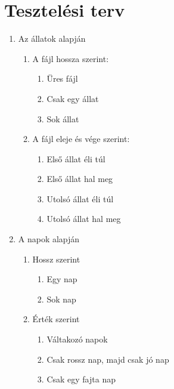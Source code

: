 \documentclass[a4paper]{article}
\begin{document}
	
	\newpage
	\section{Tesztelési terv}	
	\begin{enumerate}
		\item Az állatok alapján
		\begin{enumerate}
			\item A fájl hossza szerint:
			\begin{enumerate}
				\item Üres fájl
				\item Csak egy állat
				\item Sok állat
			\end{enumerate}
		
		\item A fájl eleje és vége szerint:
		\begin{enumerate}		
			\item Első állat éli túl
			\item Első állat hal meg
			\item Utolsó állat éli túl
			\item Utolsó állat hal meg
		\end{enumerate}						
					
		\end{enumerate}
		\item A napok alapján
		\begin{enumerate}
			\item Hossz szerint
			\begin{enumerate}
				\item Egy nap
				\item Sok nap				
			\end{enumerate}
			\item Érték szerint
			\begin{enumerate}
				\item Váltakozó napok
				\item Csak rossz nap, majd csak jó nap	
				\item Csak egy fajta nap							
			\end{enumerate}
		\end{enumerate}		
	\end{enumerate}
		
			
			
			
		
	
		
\end{document}
